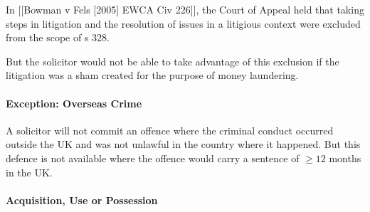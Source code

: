 \documentclass[
]{article}
\newenvironment{Shaded}{}{}
\newcommand{\NormalTok}[1]{#1}
\begin{document}
\begin{Shaded}
\begin{Highlighting}[]
\NormalTok{In [[Bowman v Fels [2005] EWCA Civ 226]], the Court of Appeal held that taking steps in litigation and the resolution of issues in a litigious context were excluded from the scope of s 328. }
\end{Highlighting}
\end{Shaded}

But the solicitor would not be able to take advantage of this exclusion
if the litigation was a sham created for the purpose of money
laundering.

\hypertarget{exception-overseas-crime}{%
\paragraph{Exception: Overseas Crime}\label{exception-overseas-crime}}

A solicitor will not commit an offence where the criminal conduct
occurred outside the UK and was not unlawful in the country where it
happened. But this defence is not available where the offence would
carry a sentence of \(\geq 12\) months in the UK.

\hypertarget{acquisition-use-or-possession}{%
\paragraph{Acquisition, Use or
Possession}\label{acquisition-use-or-possession}}
\end{document}
